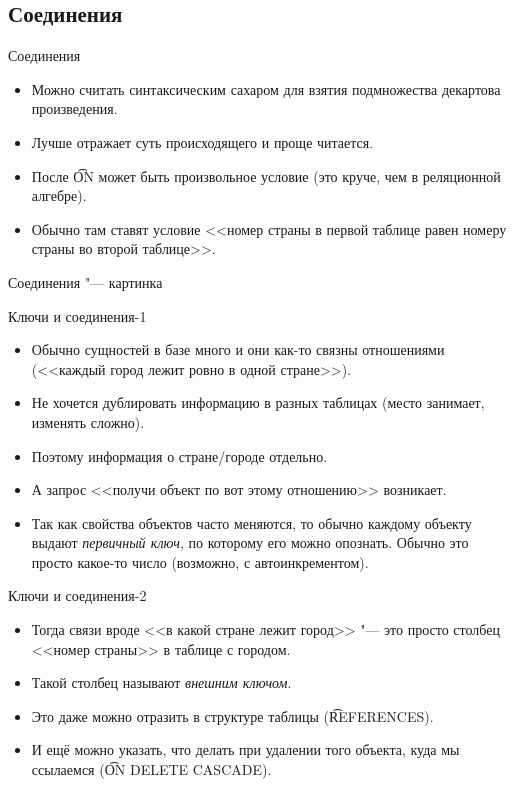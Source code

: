 \subsection{Соединения}
\begin{frame}
\end{frame}

\begin{frame}{Соединения}
	\begin{itemize}
		\item Можно считать синтаксическим сахаром для взятия подмножества декартова произведения.
		\item Лучше отражает суть происходящего и проще читается.
		\item После \t{ON} может быть произвольное условие (это круче, чем в реляционной алгебре).
		\item Обычно там ставят условие <<номер страны в первой таблице равен номеру страны во второй таблице>>.
	\end{itemize}
\end{frame}

\begin{frame}[fragile]{Соединения "--- картинка}
\end{frame}

\begin{frame}{Ключи и соединения-1}
	\begin{itemize}
		\item Обычно сущностей в базе много и они как-то связны отношениями (<<каждый город лежит ровно в одной стране>>).
		\item Не хочется дублировать информацию в разных таблицах (место занимает, изменять сложно).
		\item Поэтому информация о стране/городе отдельно.
		\item А запрос <<получи объект по вот этому отношению>> возникает.
		\item
			Так как свойства объектов часто меняются, то обычно каждому объекту выдают \textit{первичный ключ},
			по которому его можно опознать.
			Обычно это просто какое-то число (возможно, с автоинкрементом).
	\end{itemize}
\end{frame}

\begin{frame}{Ключи и соединения-2}
	\begin{itemize}
		\item Тогда связи вроде <<в какой стране лежит город>> "--- это просто столбец <<номер страны>> в таблице с городом.
		\item Такой столбец называют \textit{внешним ключом}.
		\item Это даже можно отразить в структуре таблицы (\t{REFERENCES}).
		\item И ещё можно указать, что делать при удалении того объекта, куда мы ссылаемся (\t{ON DELETE CASCADE}).
	\end{itemize}
\end{frame}

